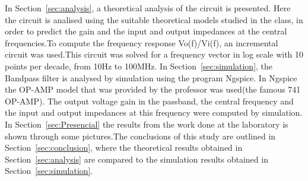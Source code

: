 In Section~\ref{sec:analysis}, a theoretical analysis of the circuit is
presented. Here the circuit is analised using the suitable theoretical models studied in the class, in order to predict the gain and the input and output impedances at the central frequencies.To compute the frequency response Vo(f)/Vi(f), an incremental circuit was used.This circuit was solved for a frequency vector in log scale with 10 points per decade, from 10Hz to 100MHz. 
In Section~\ref{sec:simulation}, the Bandpass filter is analysed by
simulation using the program Ngspice. In Ngspice the OP-AMP model that was provided by the professor was used(the famous 741 OP-AMP). The output voltage gain in the passband, the central frequency  and the input and output impedances at this frequency were computed by simulation. In Section~\ref{sec:Presencial} the results from the work done at the laboratory is shown through some pictures.The conclusions of this study are outlined in Section~\ref{sec:conclusion}, where the theoretical results obtained in Section~\ref{sec:analysis} are compared to the simulation results obtained in Section~\ref{sec:simulation}.





\pagebreak

